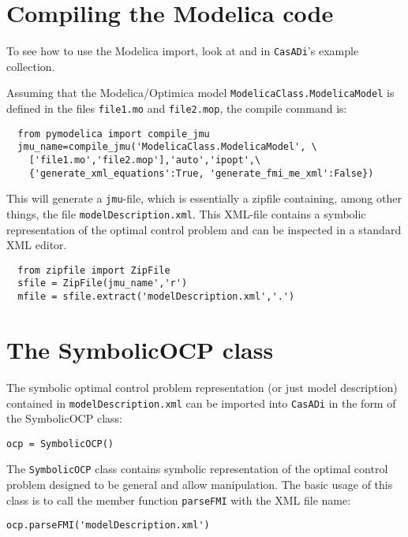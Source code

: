\documentclass[a4paper,12pt]{book}
\newcommand{\CasADi}{\texttt{CasADi}\xspace}
\begin{document}
\section{Compiling the Modelica code} \label{sec:modelica_compilation}
To see how to use the Modelica import, look at  and  in \CasADi's example collection. 

Assuming that the Modelica/Optimica model \texttt{ModelicaClass.ModelicaModel} is defined in the files \texttt{file1.mo} and \texttt{file2.mop}, the compile command is:
\begin{verbatim}
  from pymodelica import compile_jmu
  jmu_name=compile_jmu('ModelicaClass.ModelicaModel', \
    ['file1.mo','file2.mop'],'auto','ipopt',\
    {'generate_xml_equations':True, 'generate_fmi_me_xml':False})
\end{verbatim}

This will generate a \texttt{jmu}-file, which is essentially a zipfile containing, among other things, the file \texttt{modelDescription.xml}. This XML-file contains a symbolic representation of the optimal control problem and can be inspected in a standard XML editor.
\begin{verbatim}
  from zipfile import ZipFile
  sfile = ZipFile(jmu_name','r')
  mfile = sfile.extract('modelDescription.xml','.')
\end{verbatim}

\section{The SymbolicOCP class} \label{sec:modelica_import}
The symbolic optimal control problem representation (or just model description) contained in \texttt{modelDescription.xml} can be imported into \CasADi in the form of the SymbolicOCP class:
\begin{verbatim}
ocp = SymbolicOCP()
\end{verbatim}

The \texttt{SymbolicOCP} class contains symbolic representation of the optimal control problem designed to be general and allow manipulation. The basic usage of this class is to call the member function \texttt{parseFMI} with the XML file name:
\begin{verbatim}
ocp.parseFMI('modelDescription.xml')
\end{verbatim}
\end{document}
